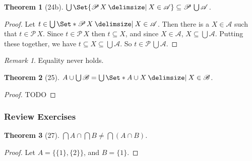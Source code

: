 \documentclass[12pt]{article}
\theoremstyle{plain}
\newtheorem*{exthm}{Theorem}
\theoremstyle{remark}
\theoremstyle{definition}
\theoremstyle{remark}
\newtheorem*{remark}{Remark}
\newcommand{\powerset}{\mathscr{P}\,}
\providecommand\st{}
\newcommand\SetSymbol[1][]{%
  \nonscript\:#1\vert%
  \allowbreak%
  \nonscript\:
\mathopen{}}
\renewcommand\st{\SetSymbol[\delimsize]}
\begin{document}
\begin{exthm}[24b]
  $\bigcup \Set{\powerset X \st X \in \mathscr{A}} \subseteq \powerset \bigcup \mathscr{A}$.
\end{exthm}
\begin{proof}
  Let $t \in \bigcup \Set*{\powerset X \st X \in \mathscr{A}}$. Then there is a $X \in \mathscr{A}$ such that $t \in \powerset X$. Since $t \in \powerset X$ then $t \subseteq X$, and since $X \in \mathscr{A}$, $X \subseteq \bigcup \mathscr{A}$. Putting these together, we have $t \subseteq X \subseteq \bigcup \mathscr{A}$. So $t \in \powerset \bigcup \mathscr{A}$.
\end{proof}
\begin{remark}
  Equality never holds.
\end{remark}

\begin{exthm}[25]
  $A \cup \bigcup \mathscr{B} = \bigcup\Set*{A \cup X \st X \in \mathscr{B}}$.
\end{exthm}
\begin{proof}
  TODO
\end{proof}

\subsubsection{Review Exercises}

\begin{exthm}[27]
  $\bigcap A \cap \bigcap B \neq \bigcap(A \cap B)$.
\end{exthm}
\begin{proof}
  Let $A = \{\{1\}, \{2\}\}$, and $B = \{1\}$.
\end{proof}
\end{document}
